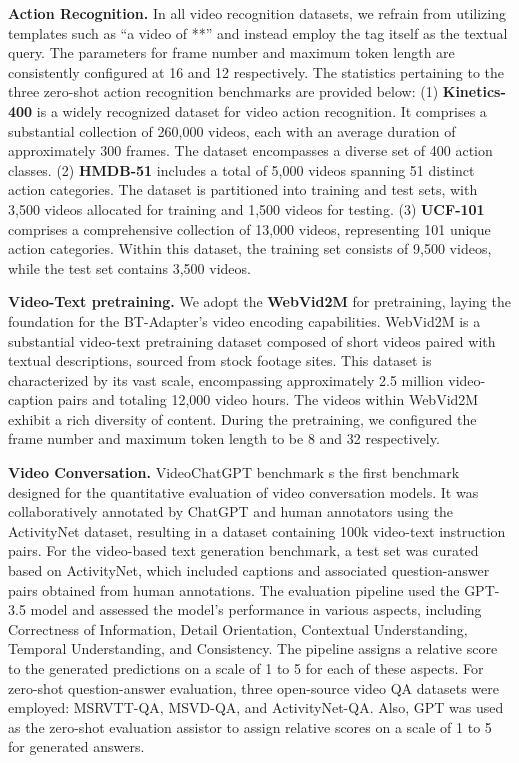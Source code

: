 \documentclass{article} \usepackage{iclr2024_conference,times}
\begin{document}
\textbf{Action Recognition.}
In all video recognition datasets, we refrain from utilizing templates such as ``a video of **'' and instead employ the tag itself as the textual query. The parameters for frame number and maximum token length are consistently configured at 16 and 12 respectively. The statistics pertaining to the three zero-shot action recognition benchmarks are provided below: (1) \textbf{Kinetics-400} \citep{carreira2017quo} is a widely recognized dataset for video action recognition. It comprises a substantial collection of 260,000 videos, each with an average duration of approximately 300 frames. The dataset encompasses a diverse set of 400 action classes. (2) \textbf{HMDB-51} \citep{kuehne2011hmdb} includes a total of 5,000 videos spanning 51 distinct action categories. The dataset is partitioned into training and test sets, with 3,500 videos allocated for training and 1,500 videos for testing. (3) \textbf{UCF-101} \citep{soomro2012ucf101} comprises a comprehensive collection of 13,000 videos, representing 101 unique action categories. Within this dataset, the training set consists of 9,500 videos, while the test set contains 3,500 videos.

\textbf{Video-Text pretraining.} We adopt the \textbf{WebVid2M} \citep{bain2021frozen} for pretraining, laying the foundation for the BT-Adapter's video encoding capabilities. WebVid2M is a substantial video-text pretraining dataset composed of short videos paired with textual descriptions, sourced from stock footage sites. This dataset is characterized by its vast scale, encompassing approximately 2.5 million video-caption pairs and totaling 12,000 video hours. The videos within WebVid2M exhibit a rich diversity of content. During the pretraining, we configured the frame number and maximum token length to be 8 and 32 respectively.

\textbf{Video Conversation.} 
VideoChatGPT benchmark \citep{maaz2023video} s the first benchmark designed for the quantitative evaluation of video conversation models. It was collaboratively annotated by ChatGPT and human annotators using the ActivityNet dataset, resulting in a dataset containing 100k video-text instruction pairs. For the video-based text generation benchmark, a test set was curated based on ActivityNet, which included captions and associated question-answer pairs obtained from human annotations. The evaluation pipeline used the GPT-3.5 model and assessed the model's performance in various aspects, including Correctness of Information, Detail Orientation, Contextual Understanding, Temporal Understanding, and Consistency. The pipeline assigns a relative score to the generated predictions on a scale of 1 to 5 for each of these aspects. For zero-shot question-answer evaluation, three open-source video QA datasets were employed: MSRVTT-QA, MSVD-QA, and ActivityNet-QA. Also, GPT was used as the zero-shot evaluation assistor to assign relative scores on a scale of 1 to 5 for generated answers.
\end{document}
